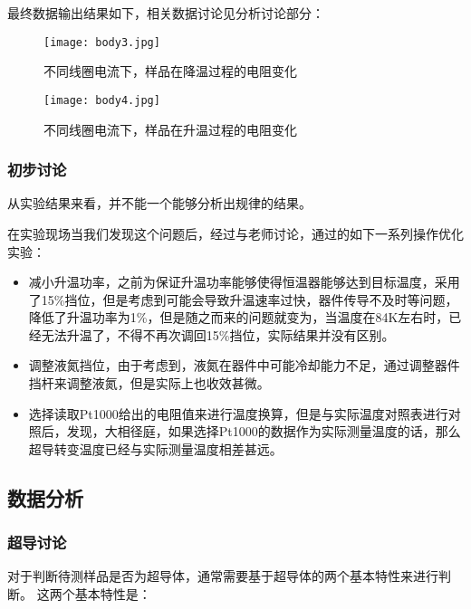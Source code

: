 最终数据输出结果如下，相关数据讨论见分析讨论部分：
\begin{figure}[{H}]
	\centering
	\texttt{[image: body3.jpg]}
	\caption{不同线圈电流下，样品在降温过程的电阻变化}
	\label{11}
\end{figure}
\begin{figure}[{H}]
	\centering
	\texttt{[image: body4.jpg]}
	\caption{不同线圈电流下，样品在升温过程的电阻变化}
	\label{22}
\end{figure}


\subsubsection{初步讨论}

从实验结果来看，并不能一个能够分析出规律的结果。

在实验现场当我们发现这个问题后，经过与老师讨论，通过的如下一系列操作优化实验：
\begin{itemize}
	\item 减小升温功率，之前为保证升温功率能够使得恒温器能够达到目标温度，采用了15\%挡位，但是考虑到可能会导致升温速率过快，器件传导不及时等问题，降低了升温功率为1\%，但是随之而来的问题就变为，当温度在84K左右时，已经无法升温了，不得不再次调回15\%挡位，实际结果并没有区别。
	\item 调整液氮挡位，由于考虑到，液氮在器件中可能冷却能力不足，通过调整器件挡杆来调整液氮，但是实际上也收效甚微。
	\item 选择读取Pt1000给出的电阻值来进行温度换算，但是与实际温度对照表进行对照后，发现，大相径庭，如果选择Pt1000的数据作为实际测量温度的话，那么超导转变温度已经与实际测量温度相差甚远。
\end{itemize}




\clearpage


\subsection{数据分析}

\subsubsection{超导讨论}
对于判断待测样品是否为超导体，通常需要基于超导体的两个基本特性来进行判断。
这两个基本特性是：


